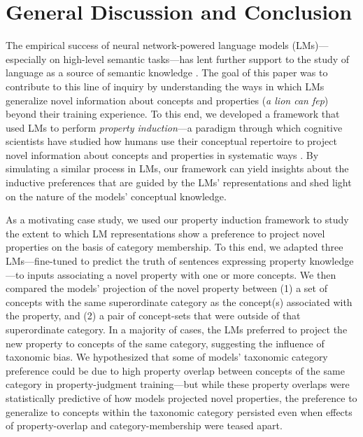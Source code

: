 \documentclass[10pt,letterpaper]{article}
\begin{document}
\section{General Discussion and Conclusion}
The empirical success of neural network-powered language models (LMs)---especially on high-level semantic tasks---has lent further support to the study of language as a source of semantic knowledge \citep{elman2004alternative, lupyan2019words}.
The goal of this paper was to contribute to this line of inquiry by understanding the ways in which  LMs generalize novel information about concepts and properties (\textit{a lion can fep}) beyond their training experience.
To this end, we developed a framework that used LMs to perform \textit{property induction}---a paradigm through which cognitive scientists have studied how humans use their conceptual repertoire to project novel information about concepts and properties in systematic ways \citep{rips1975inductive, osherson1990category, hayes2018inductive}.
By simulating a similar process in LMs, our framework can yield insights about the inductive preferences that are guided by the LMs' representations and shed light on the nature of the models' conceptual knowledge.

As a motivating case study, we used our property induction framework to study the extent to which LM representations show a preference to project novel properties on the basis of category membership. 
To this end, we adapted three LMs---fine-tuned to predict the truth of sentences expressing property knowledge---to inputs associating a novel property with one or more concepts. We then compared the models' projection of the novel property between (1) a set of concepts with the same superordinate category as the concept(s) associated with the property, and (2) a pair of concept-sets that were outside of that superordinate category.
In a majority of cases, the LMs preferred to project the new property to concepts of the same category, suggesting the influence of taxonomic bias. 
We hypothesized that some of models' taxonomic category preference could be due to high property overlap between concepts of the same category in property-judgment training---but while these property overlaps were statistically predictive of how models projected novel properties, the preference to generalize to concepts within the taxonomic category persisted even when effects of property-overlap and category-membership were teased apart.
\end{document}
